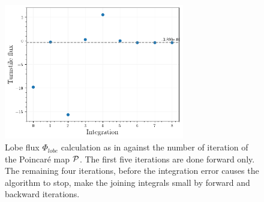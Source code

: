 \begin{figure}[H]
    \centering
    \includegraphics[width=0.7\textwidth]{images/turnstile/turnstile_area_final.png}
    \caption{Lobe flux $\Phi_{lobe}$ calculation as in  against the number of iteration of the Poincaré map $\mathcal{P}$. The first five iterations are done forward only. The remaining four iterations, before the integration error causes the algorithm to stop, make the joining integrals small by forward and backward iterations.}
    \label{fig:turnstile-convergence}
\end{figure}

